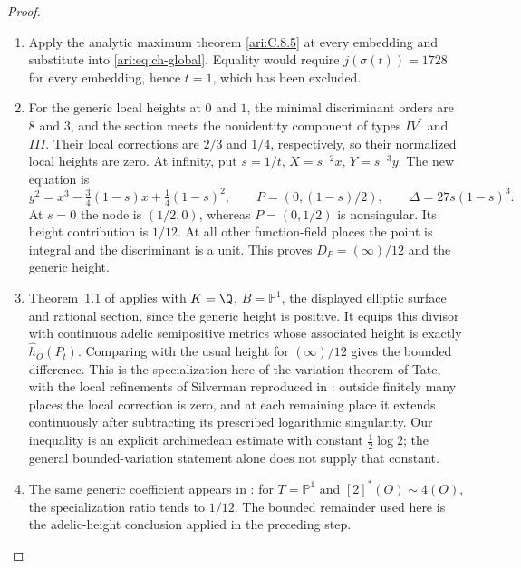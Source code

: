 \begin{proof}
\begin{enumerate}[label=\arabic*.,leftmargin=*]
\item Apply the analytic maximum theorem \ref{ari:C.8.5} at every embedding
and substitute into \eqref{ari:eq:ch-global}. Equality would
require $j(\sigma(t))=1728$ for every embedding, hence $t=1$,
which has been excluded.

\item For the generic local heights at $0$ and $1$, the minimal
discriminant orders are $8$ and $3$, and the section meets
the nonidentity component of types $IV^*$ and $III$.
Their local corrections are $2/3$ and $1/4$, respectively,
so their normalized local heights are zero. At infinity,
put $s=1/t$, $X=s^{-2}x$, $Y=s^{-3}y$. The new equation is
\[
 y^2=x^3-\tfrac34(1-s)x+\tfrac14(1-s)^2,
 \qquad P=(0,(1-s)/2),\qquad\Delta=27s(1-s)^3.
\]
At $s=0$ the node is $(1/2,0)$, whereas $P=(0,1/2)$ is
nonsingular. Its height contribution is $1/12$.
At all other function-field places the point is integral
and the discriminant is a unit. This proves
$D_P=(\infty)/12$ and the generic height.

\item Theorem~1.1 of \citet[arXiv v2, p.~2]{demarco2017} applies with $K=\Q$,
$B=\mathbb P^1$, the displayed elliptic surface and rational
section, since the generic height is positive. It equips
this divisor with continuous adelic semipositive metrics
whose associated height is exactly $\widehat h_O(P_t)$.
Comparing with the usual height for $(\infty)/12$ gives the
bounded difference. This is the specialization here of the
variation theorem of Tate, with the local refinements of
Silverman reproduced in \citet[Theorems~2.2--2.3, arXiv v2, pp.~7--8]{demarco2017}:
outside finitely many places the local correction is zero,
and at each remaining place it extends continuously after
subtracting its prescribed logarithmic singularity.
Our inequality is an explicit archimedean estimate with
constant $\frac12\log2$; the general bounded-variation
statement alone does not supply that constant.

\item The same generic coefficient appears in
\cite[Theorem~4.1 and the following remark, pp.~183--184]{callSilverman1993}:
for $T=\mathbb P^1$ and $[2]^*(O)\sim4(O)$, the specialization
ratio tends to $1/12$. The bounded remainder used here is the
adelic-height conclusion applied in the preceding step.
\end{enumerate}
\end{proof}